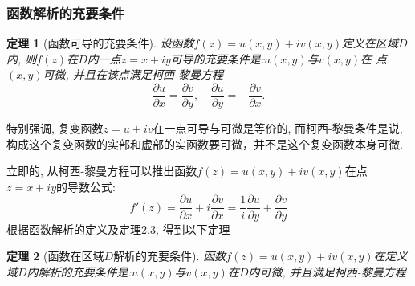 \documentclass[12pt, a4paper, oneside]{ctexart}
\newtheorem{theorem}{定理}[section]
\begin{document}
\subsubsection{函数解析的充要条件}
\begin{theorem}[函数可导的充要条件]
设函数$f(z)=u(x,y)+iv(x,y)$定义在区域$D$内, 则$f(z)$在$D$内一点$z=x+iy$可导的充要条件是:$u(x,y)$与$v(x,y)$在
点$(x,y)$可微, 并且在该点满足柯西-黎曼方程
\[
    \frac{\partial u}{\partial x}=\frac{\partial v}{\partial y}, \quad\frac{\partial u}{\partial y} = -\frac{\partial v}{\partial x}.
\]
\end{theorem}
特别强调, 复变函数$z=u+iv$在一点可导与可微是等价的, 而柯西-黎曼条件是说, 构成这个复变函数的实部和虚部的实函数要可微，并不是这个复变函数本身可微.

立即的, 从柯西-黎曼方程可以推出函数$f(z)=u(x,y)+iv(x,y)$在点$z=x+iy$的导数公式:
\[
    f'(z)=\frac{\partial u}{\partial x}+i\frac{\partial v}{\partial x}=\frac{1}{i}\frac{\partial u}{\partial y}+\frac{\partial v}{\partial y}
\]
根据函数解析的定义及定理2.3, 得到以下定理
\begin{theorem}[函数在区域$D$解析的充要条件]
    函数$f(z)=u(x,y)+iv(x,y)$在定义域$D$内解析的充要条件是:$u(x,y)$与$v(x,y)$在$D$内可微, 并且满足柯西-黎曼方程
\end{theorem}
\end{document}
